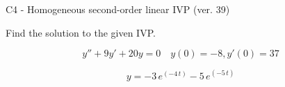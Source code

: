 \begin{exercise}
  \begin{exerciseTitle}C4 - Homogeneous second-order linear IVP (ver. 39)\end{exerciseTitle}
  \begin{exerciseStatement}
    
Find the solution to the given IVP.

    
\[y''+9y'+20y = 0 \hspace{1em} y(0) = -8 , y'(0) = 37\]

  \end{exerciseStatement}
  \begin{exerciseAnswer}
    
\[y= -3 \, e^{\left(-4 \, t\right)} - 5 \, e^{\left(-5 \, t\right)}\]

  \end{exerciseAnswer}
\end{exercise}